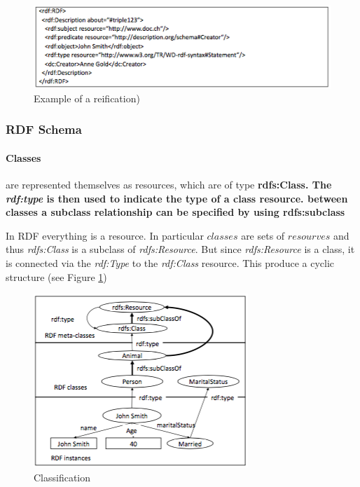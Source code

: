 \begin{figure}[H]
\begin{center}
\includegraphics[width=1\linewidth]{figures/reification.png}
\end{center}
\caption{Example of a reification)}
\end{figure}

\subsubsection{RDF Schema}

\paragraph{Classes} are represented themselves as resources, which are of type \bf{rdfs:Class}. The \textit{rdf:type} is then used to indicate the type of a class resource. between classes a subclass relationship can be specified by using \bf{rdfs:subclass}

In RDF everything is a resource. In particular $classes$ are sets of $resourves$ and thus \textit{rdfs:Class} is a subclass of \textit{rdfs:Resource}. But since \textit{rdfs:Resource} is a class, it is connected via the \textit{rdf:Type} to the \textit{rdf:Class} resource. This produce a cyclic structure (see Figure \ref{fig:class})

\begin{figure}[H]
\begin{center}
\includegraphics[width=1\linewidth]{figures/class.png}
\end{center}
\caption{Classification}
\label{fig:class}
\end{figure}

